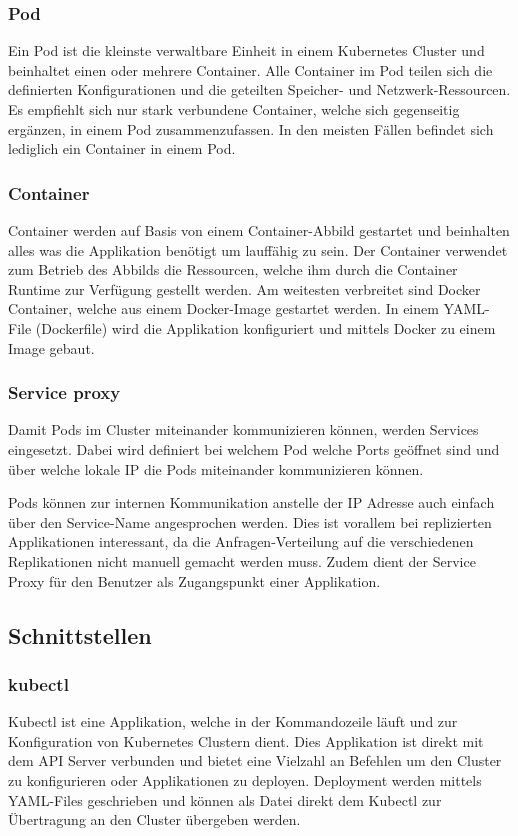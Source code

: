 \subsubsection{Pod}
Ein Pod ist die kleinste verwaltbare Einheit in einem Kubernetes Cluster und beinhaltet einen oder mehrere Container. Alle Container im Pod teilen sich die definierten Konfigurationen und die geteilten Speicher- und Netzwerk-Ressourcen. Es empfiehlt sich nur stark verbundene Container, welche sich gegenseitig ergänzen, in einem Pod zusammenzufassen. In den meisten Fällen befindet sich lediglich ein Container in einem Pod. \cite{kubernetes}
\subsubsection{Container}
Container werden auf Basis von einem Container-Abbild gestartet und beinhalten alles was die Applikation benötigt um lauffähig zu sein. Der Container verwendet zum Betrieb des Abbilds die Ressourcen, welche ihm durch die Container Runtime zur Verfügung gestellt werden. Am weitesten verbreitet sind Docker Container, welche aus einem Docker-Image gestartet werden. In einem YAML-File (Dockerfile) wird die Applikation konfiguriert und mittels Docker zu einem Image gebaut.  \cite{kubernetes}
\subsubsection{Service proxy}
Damit Pods im Cluster miteinander kommunizieren können, werden Services eingesetzt. Dabei wird definiert bei welchem Pod welche Ports geöffnet sind und über welche lokale IP die Pods miteinander kommunizieren können.

Pods können zur internen Kommunikation anstelle der IP Adresse auch einfach über den Service-Name angesprochen werden. Dies ist vorallem bei replizierten Applikationen interessant, da die Anfragen-Verteilung auf die verschiedenen Replikationen nicht manuell gemacht werden muss. 
Zudem dient der Service Proxy für den Benutzer als Zugangspunkt einer Applikation.  \cite{kubernetes}

\subsection{Schnittstellen}
\subsubsection{kubectl}
Kubectl ist eine Applikation, welche in der Kommandozeile läuft und zur Konfiguration von Kubernetes Clustern dient. Dies Applikation ist direkt mit dem API Server verbunden und bietet eine Vielzahl an Befehlen um den Cluster zu konfigurieren oder Applikationen zu deployen. 
Deployment werden mittels YAML-Files geschrieben und können als Datei direkt dem Kubectl zur Übertragung an den Cluster übergeben werden. \cite{kubernetes}
